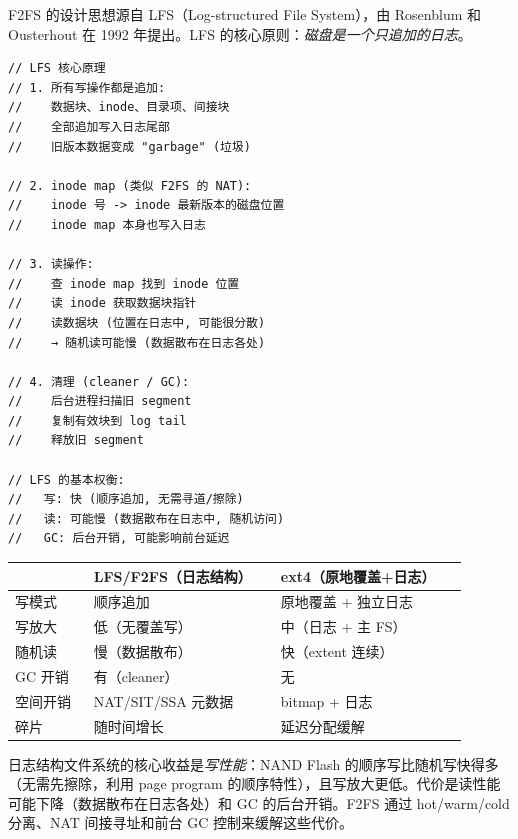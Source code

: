 \begin{filesystemlayout}

F2FS 的设计思想源自 LFS（Log-structured File System），由 Rosenblum 和 Ousterhout 在 1992 年提出。LFS 的核心原则：\emph{磁盘是一个只追加的日志}。

\begin{lstlisting}
// LFS 核心原理
// 1. 所有写操作都是追加:
//    数据块、inode、目录项、间接块
//    全部追加写入日志尾部
//    旧版本数据变成 "garbage" (垃圾)

// 2. inode map (类似 F2FS 的 NAT):
//    inode 号 -> inode 最新版本的磁盘位置
//    inode map 本身也写入日志

// 3. 读操作:
//    查 inode map 找到 inode 位置
//    读 inode 获取数据块指针
//    读数据块 (位置在日志中, 可能很分散)
//    → 随机读可能慢 (数据散布在日志各处)

// 4. 清理 (cleaner / GC):
//    后台进程扫描旧 segment
//    复制有效块到 log tail
//    释放旧 segment

// LFS 的基本权衡:
//   写: 快 (顺序追加, 无需寻道/擦除)
//   读: 可能慢 (数据散布在日志中, 随机访问)
//   GC: 后台开销, 可能影响前台延迟
\end{lstlisting}

\begin{longtable}{|F{0.16\linewidth}|F{0.38\linewidth}|F{0.38\linewidth}|}
\toprule
{}
& LFS/F2FS（日志结构） & ext4（原地覆盖+日志） \\
\midrule
写模式 & 顺序追加 & 原地覆盖 + 独立日志 \\\tablerowrule
写放大 & 低（无覆盖写） & 中（日志 + 主 FS） \\\tablerowrule
随机读 & 慢（数据散布） & 快（extent 连续） \\\tablerowrule
GC 开销 & 有（cleaner） & 无 \\\tablerowrule
空间开销 & NAT/SIT/SSA 元数据 & bitmap + 日志 \\\tablerowrule
碎片 & 随时间增长 & 延迟分配缓解 \\
\bottomrule
\end{longtable}

\begin{keyidea}
日志结构文件系统的核心收益是\emph{写性能}：NAND Flash 的顺序写比随机写快得多（无需先擦除，利用 page program 的顺序特性），且写放大更低。代价是读性能可能下降（数据散布在日志各处）和 GC 的后台开销。F2FS 通过 hot/warm/cold 分离、NAT 间接寻址和前台 GC 控制来缓解这些代价。
\end{keyidea}



\end{filesystemlayout}
